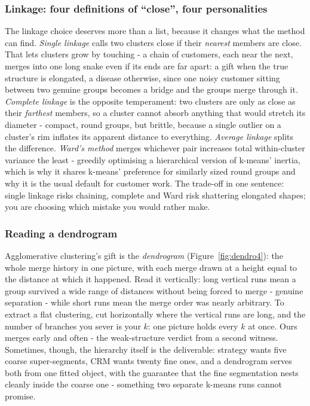 \documentclass[11pt,a4paper]{article}
\begin{document}
\subsubsection{Linkage: four definitions of ``close'', four personalities}
The linkage choice deserves more than a list, because it changes what
the method can find. \emph{Single linkage} calls two clusters close if
their \emph{nearest} members are close. That lets clusters grow by
touching - a chain of customers, each near the next, merges into one
long snake even if its ends are far apart: a gift when the true
structure is elongated, a disease otherwise, since one noisy customer
sitting between two genuine groups becomes a bridge and the groups
merge through it. \emph{Complete linkage} is the opposite temperament:
two clusters are only as close as their \emph{farthest} members, so a
cluster cannot absorb anything that would stretch its diameter -
compact, round groups, but brittle, because a single outlier on a
cluster's rim inflates its apparent distance to everything.
\emph{Average linkage} splits the difference. \emph{Ward's method}
merges whichever pair increases total within-cluster variance the least
- greedily optimising a hierarchical version of k-means' inertia,
which is why it shares k-means' preference for similarly sized round
groups and why it is the usual default for customer work. The trade-off
in one sentence: single linkage risks chaining, complete and Ward risk
shattering elongated shapes; you are choosing which mistake you would
rather make.

\subsubsection{Reading a dendrogram}
Agglomerative clustering's gift is the \emph{dendrogram}
(Figure~\ref{fig:dendro4}): the whole merge history in one picture,
with each merge drawn at a height equal to the distance at which it
happened. Read it vertically: long vertical runs mean a group survived
a wide range of distances without being forced to merge - genuine
separation - while short runs mean the merge order was nearly
arbitrary. To extract a flat clustering, cut horizontally where the
vertical runs are long, and the number of branches you sever is your
$k$: one picture holds every $k$ at once. Ours merges early and often
- the weak-structure verdict from a second witness. Sometimes, though,
the hierarchy itself is the deliverable: strategy wants five coarse
super-segments, CRM wants twenty fine ones, and a dendrogram serves
both from one fitted object, with the guarantee that the fine
segmentation nests cleanly inside the coarse one - something two
separate k-means runs cannot promise.
\end{document}
